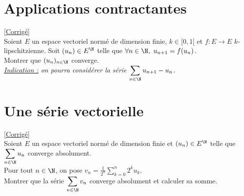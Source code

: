 \documentclass{book}
\begin{document}
	\section{Applications contractantes}
	\textcolor{blue}{\hyperref[sec:applications-contractantes]{[Corrigé]}}\\
	\label{Application contractantes}
	Soient $E$ un espace vectoriel normé de dimension finie, $k\in [0,1[$ et $f:E\to E$ $k$-lipschitzienne. Soit $(u_n)\in E^\N$ telle que $\forall n\in \N,\ u_{n+1}=f(u_n)$.\\
	Montrer que $(u_n)_{n\in \N}$ converge.\\
	\textit{\underline{Indication :} on pourra considérer la série $\displaystyle\sum_{n\in \N}u_{n+1}-u_n$.}
	
	\section{Une série vectorielle}
	\textcolor{blue}{\hyperref[sec:une-serie-vectorielle]{[Corrigé]}}\\
	\label{Une série vectorielle}
	Soient $E$ un espace vectoriel normé de dimension finie et $(u_n)\in E^\N$ telle que $\displaystyle\sum_{n\in \N}u_n$ converge absolument.\\
	Pour tout $n\in \N$, on pose $v_n=\displaystyle\frac{1}{2^n}\sum_{k=0}^n2^ku_k$.\\
	Montrer que la série $\displaystyle\sum_{n\in \N}v_n$ converge absolument et calculer sa somme.
	
\end{document}
